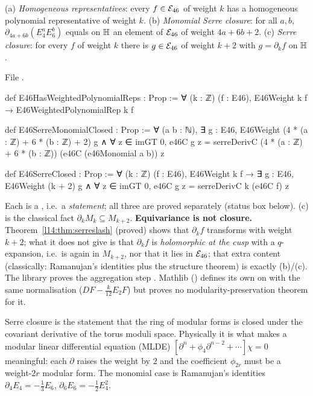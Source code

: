 \begin{definition}\label{l14:def:serreclosed}
(a) \emph{Homogeneous representatives}: every $f\in\mathcal{E}_{46}$ of weight $k$ has a homogeneous polynomial representative of
weight $k$. (b) \emph{Monomial Serre closure}: for all $a,b$, $\partial_{4a+6b}(E_4^aE_6^b)$ equals on $\mathbb{H}$ an element of
$\mathcal{E}_{46}$ of weight $4a+6b+2$. (c) \emph{Serre closure}: for every $f$ of weight $k$ there is $g\in\mathcal{E}_{46}$ of weight $k+2$
with $g = \partial_kf$ on $\mathbb{H}$.
\end{definition}
\noindent File .
\begin{leancode}
def E46HasWeightedPolynomialReps : Prop :=
  ∀ (k : ℤ) (f : E46), E46Weight k f → E46WeightedPolynomialRep k f

def E46SerreMonomialClosed : Prop :=
  ∀ (a b : ℕ), ∃ g : E46,
    E46Weight (4 * (a : ℤ) + 6 * (b : ℤ) + 2) g ∧
      ∀ z ∈ imGT 0,
        e46C g z = serreDerivC (4 * (a : ℤ) + 6 * (b : ℤ))
          (e46C (e46Monomial a b)) z

def E46SerreClosed : Prop :=
  ∀ (k : ℤ) (f : E46), E46Weight k f →
    ∃ g : E46, E46Weight (k + 2) g ∧
      ∀ z ∈ imGT 0, e46C g z = serreDerivC k (e46C f) z
\end{leancode}
\begin{dictionary}
Each is a , i.e.\ a \emph{statement}; all three are proved separately (status box below). (c) is the classical fact $\partial_kM_k\subseteq M_{k+2}$.
\textbf{Equivariance is not closure.} Theorem~\ref{l14:thm:serreslash} (proved) shows that $\partial_kf$ transforms with weight
$k+2$; what it does not give is that $\partial_kf$ is \emph{holomorphic at the cusp} with a $q$-expansion, i.e.\ is again in
$M_{k+2}$, nor that it lies in $\mathcal{E}_{46}$; that extra content (classically: Ramanujan's identities plus the structure theorem)
is exactly (b)/(c). The library proves the aggregation step
.
Mathlib () defines its own  on
 with the same normalisation ($DF - \frac{k}{12}E_2F$) but proves no modularity-preservation theorem for it.
\end{dictionary}
\begin{physics}
Serre closure is the statement that the ring of modular forms is closed under the covariant derivative of the torus
moduli space. Physically it is what makes a modular linear differential equation (MLDE) $[\partial^n + \phi_4\partial^{n-2}+
\cdots]\chi = 0$ meaningful: each $\partial$ raises the weight by $2$ and the coefficient $\phi_{2r}$ must be a weight-$2r$
modular form. The monomial case is Ramanujan's identities $\partial_4E_4 = -\frac13E_6$, $\partial_6E_6 = -\frac12E_4^2$.
\end{physics}
